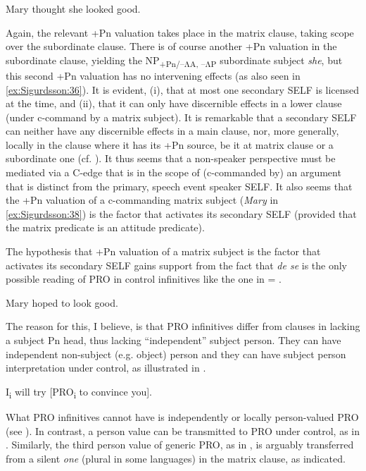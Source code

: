\documentclass[output=paper]{LSP/langsci}
\begin{document}
\ea%
    \label{ex:Sigurdsson:38}
  	   Mary thought she looked good.
\z

Again, the relevant +Pn valuation takes place in the matrix clause, taking scope over the subordinate clause. There is of course another +Pn valuation in the subordinate clause, yielding the NP\textsubscript{+Pn/–ΛA, –ΛP} subordinate subject \textit{she}, but this second +Pn valuation has no intervening effects (as also seen in \ref{ex:Sigurdsson:36}). It is evident, (i), that at most one secondary SELF is licensed at the time, and (ii), that it can only have discernible effects in a lower clause (under c-command by a matrix subject). It is remarkable that a secondary SELF can neither have any discernible effects in a main clause, nor, more generally, locally in the clause where it has its +Pn source, be it at matrix clause or a subordinate one (cf. \citealt{Thráinsson1976}). It thus seems that a non-speaker perspective must be mediated via a C-edge that is in the scope of (c-commanded by) an argument that is distinct from the primary, speech event speaker SELF. It also seems that the +Pn valuation of a c-commanding matrix subject (\textit{Mary} in \ref{ex:Sigurdsson:38}) is the factor that activates its secondary SELF (provided that the matrix predicate is an attitude predicate).

The hypothesis that +Pn valuation of a matrix subject is the factor that activates its secondary SELF gains support from the fact that \textit{de se} is the only possible reading of PRO in control infinitives like the one in  = .

\ea%
    \label{ex:Sigurdsson:39}
  	  Mary hoped to look good.
\z

The reason for this, I believe, is that PRO infinitives differ from  clauses in lacking a subject Pn head, thus lacking “independent” subject person. They can have independent non-subject (e.g. object) person and they can have subject person interpretation under control, as illustrated in .

\ea%
    \label{ex:Sigurdsson:40}

  	  I\textsubscript{i} will try [PRO\textsubscript{i} to convince you].
\z

What PRO infinitives cannot have is independently or locally person-valued PRO (see \citealt[424–425]{Sigurðsson2008Natural}). In contrast, a person value can be transmitted to PRO under control, as in . Similarly, the third person value of generic PRO, as in , is arguably transferred from a silent \textit{one} (plural in some languages) in the matrix clause, as indicated.
\end{document}
